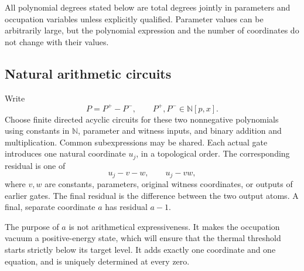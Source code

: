 \documentclass[11pt,letterpaper]{article}
\theoremstyle{definition}
\theoremstyle{remark}
\newcommand{\N}{\mathbb N}
\begin{document}
All polynomial degrees stated below are total degrees jointly in parameters and occupation variables unless explicitly qualified. Parameter values can be arbitrarily large, but the polynomial expression and the number of coordinates do not change with their values.

\subsection{Natural arithmetic circuits}
Write
\[
P=P^+-P^-,\qquad P^+,P^-\in\N[p,x].
\]
Choose finite directed acyclic circuits for these two nonnegative polynomials using constants in $\N$, parameter and witness inputs, and binary addition and multiplication. Common subexpressions may be shared. Each actual gate introduces one natural coordinate $u_j$, in a topological order. The corresponding residual is one of
\begin{equation}\label{ste:ta:eq:gates}
u_j-v-w,\qquad u_j-vw,
\end{equation}
where $v,w$ are constants, parameters, original witness coordinates, or outputs of earlier gates. The final residual is the difference between the two output atoms. A final, separate coordinate $a$ has residual $a-1$.

The purpose of $a$ is not arithmetical expressiveness. It makes the occupation vacuum a positive-energy state, which will ensure that the thermal threshold starts strictly below its target level. It adds exactly one coordinate and one equation, and is uniquely determined at every zero.
\end{document}
